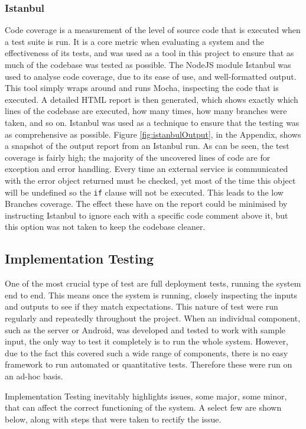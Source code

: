 \documentclass{article}
\begin{document}
\subsubsection{Istanbul}
Code coverage is a measurement of the level of source code that is executed when a test suite is run. It is a core metric when evaluating a system and the effectiveness of its tests, and was used as a tool in this project to ensure that as much of the codebase was tested as possible. The NodeJS module Istanbul was used to analyse code coverage, due to its ease of use, and well-formatted output\cite{istanbul}. This tool simply wraps around and runs Mocha, inspecting the code that is executed. A detailed HTML report is then generated, which shows exactly which lines of the codebase are executed, how many times, how many branches were taken, and so on. Istanbul was used as a technique to ensure that the testing was as comprehensive as possible. Figure \ref{fig:istanbulOutput}, in the Appendix, shows a snapshot of the output report from an Istanbul run. As can be seen, the test coverage is fairly high; the majority of the uncovered lines of code are for exception and error handling. Every time an external service is communicated with the error object returned must be checked, yet most of the time this object will be undefined so the \texttt{if} clause will not be executed. This leads to the low Branches coverage. The effect these have on the report could be minimised by instructing Istanbul to ignore each with a specific code comment above it, but this option was not taken to keep the codebase cleaner.  

\subsection{Implementation Testing}\label{ImplementationTesting}
One of the most crucial type of test are full deployment tests, running the system end to end. This means once the system is running, closely inspecting the inputs and outputs to see if they match expectations. This nature of test were run regularly and repeatedly throughout the project. When an individual component, such as the server or Android, was developed and tested to work with sample input, the only way to test it completely is to run the whole system. However, due to the fact this covered such a wide range of components, there is no easy framework to run automated or quantitative tests. Therefore these were run on an ad-hoc basis.

Implementation Testing inevitably highlights issues, some major, some minor, that can affect the correct functioning of the system. A select few are shown below, along with steps that were taken to rectify the issue.
\end{document}
